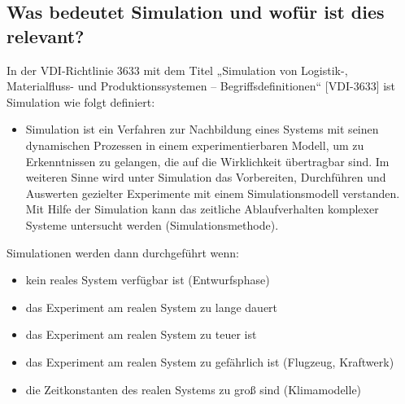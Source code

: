\subsection{Was bedeutet Simulation und wofür ist dies relevant?}
In der VDI-Richtlinie 3633 mit dem Titel „Simulation von Logistik-, Materialfluss- 
und Produktionssystemen – Begriffsdefinitionen“ [VDI-3633] ist Simulation wie folgt definiert:
\begin{itemize}
    \item  Simulation ist ein Verfahren zur Nachbildung eines Systems mit seinen 
    dynamischen Prozessen in einem experimentierbaren Modell, um zu 
    Erkenntnissen zu gelangen, die auf die Wirklichkeit übertragbar sind. Im 
    weiteren Sinne wird unter Simulation das Vorbereiten, Durchführen und 
    Auswerten gezielter Experimente mit einem Simulationsmodell verstanden. Mit 
    Hilfe der Simulation kann das zeitliche Ablaufverhalten komplexer Systeme 
    untersucht werden (Simulationsmethode).    
\end{itemize}
Simulationen werden dann durchgeführt wenn:
\begin{itemize}
    \item kein reales System verfügbar ist (Entwurfsphase)
    \item das Experiment am realen System zu lange dauert
    \item das Experiment am realen System zu teuer ist
    \item das Experiment am realen System zu gefährlich ist (Flugzeug, Kraftwerk)
    \item die Zeitkonstanten des realen Systems zu groß sind (Klimamodelle)
\end{itemize}